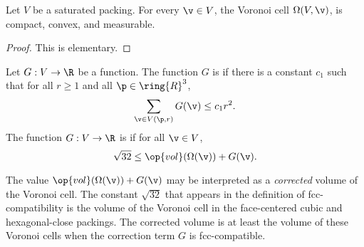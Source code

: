 \begin{lemma}
Let $ V$ be a saturated packing.  For every $\v\in  V$, 
the Voronoi cell $\Omega( V,\v)$,  is
compact, convex, and measurable.
\end{lemma}

\begin{proof}  This is elementary.
\end{proof}

\begin{definition}\label{def:negligible}
Let $G: V\to\R$ be a function.  The function $G$
is 
if there is a constant $c_1$ such that for all $r\ge1$ and all
$\p\in\ring{R}^3$,
\begin{displaymath}\sum_{\v\in V(\p,r)} G(\v) \le c_1
r^2.\end{displaymath}
The function $G: V\to\R$ is
if for all $\v\in V$, 
\begin{displaymath}\sqrt{32}\le \op{vol}(\Omega(\v)) +
G(\v).\end{displaymath}
%
%
%
\end{definition}





\begin{remark}
The value $\op{vol}(\Omega(\v)) + G(\v)$ may be interpreted as a
{\it corrected\/} volume of the Voronoi cell. The constant
$\sqrt{32}$ that appears in the definition of fcc-compatibility is
the volume of the Voronoi cell in the face-centered cubic and
hexagonal-close packings.  The corrected volume is at least the
volume of these Voronoi cells when the correction term $G$ is
fcc-compatible.  %
\end{remark}



